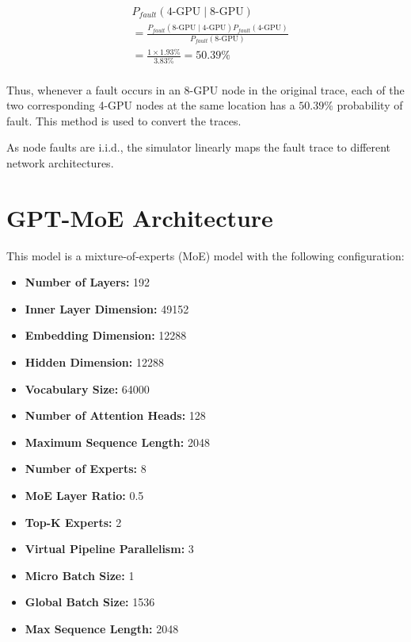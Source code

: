 \begin{appendices}
\begin{align*}\label{eq:convert-trace}
& P_{fault}( \text{4-GPU} \mid  \text{8-GPU})\\ 
    &=\frac{P_{fault}(\text{8-GPU} \mid \text{4-GPU}) P_{fault}(\text{4-GPU})}{P_{fault}(\text{8-GPU})} \\ 
    & =  \frac{1 \times 1.93\%}{3.83\%} = 50.39\% \\
\end{align*}

Thus, whenever a fault occurs in an 8-GPU node in the original trace, each of the two corresponding 4-GPU nodes at the same location has a $50.39\%$ probability of fault. This method is used to convert the traces.

As node faults are i.i.d., the simulator linearly maps the fault trace to different network architectures.

\section{GPT-MoE Architecture}
\label{appendix:gpt-moe}
This model is a mixture-of-experts (MoE) model with the following configuration:

\begin{itemize}
    \item \textbf{Number of Layers:} 192
    \item \textbf{Inner Layer Dimension:} 49152
    \item \textbf{Embedding Dimension:} 12288
    \item \textbf{Hidden Dimension:} 12288
    \item \textbf{Vocabulary Size:} 64000
    \item \textbf{Number of Attention Heads:} 128
    \item \textbf{Maximum Sequence Length:} 2048
    \item \textbf{Number of Experts:} 8
    \item \textbf{MoE Layer Ratio:} 0.5
    \item \textbf{Top-K Experts:} 2
\end{itemize}

\begin{itemize}
    \item \textbf{Virtual Pipeline Parallelism:} 3
    \item \textbf{Micro Batch Size:} 1
    \item \textbf{Global Batch Size:} 1536
    \item \textbf{Max Sequence Length:} 2048
\end{itemize}



\end{appendices}
